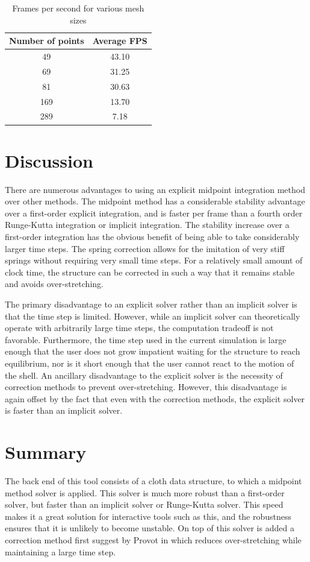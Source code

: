 \documentclass{thesis}
\begin{document}
\begin{table}
\begin{center}
  \begin{tabular}{ | c | c | }
    \hline
    Number of points & Average FPS \\ \hline
	49 & 43.10 \\ \hline
	69 & 31.25 \\ \hline
    81 & 30.63 \\ \hline
	169 & 13.70 \\ \hline
    289 & 7.18 \\ \hline
  \end{tabular}
  \caption{Frames per second for various mesh sizes}
\end{center}
\end{table}

\section{Discussion}
There are numerous advantages to using an explicit midpoint integration method over other methods.  The midpoint method has a
considerable stability advantage over a first-order explicit integration, and is faster per frame than a fourth order Runge-Kutta
integration or implicit integration.  The stability increase over a first-order integration has the obvious benefit of being able to
take considerably larger time steps.  The spring correction allows for the imitation of very stiff springs without requiring very
small time steps.  For a relatively small amount of clock time, the structure can be corrected in such a way that it remains stable
and avoids over-stretching.

The primary disadvantage to an explicit solver rather than an implicit solver is that the time step is limited.  However, while an
implicit solver can theoretically operate with arbitrarily large time steps, the computation tradeoff is not favorable.  Furthermore,
the time step used in the current simulation is large enough that the user does not grow impatient waiting for the structure to reach
equilibrium, nor is it short enough that the user cannot react to the motion of the shell.  An ancillary disadvantage to the
explicit solver is the necessity of correction methods to prevent over-stretching.  However, this disadvantage is again offset by the
fact that even with the correction methods, the explicit solver is faster than an implicit solver.

\section{Summary}
The back end of this tool consists of a cloth data structure, to which a midpoint method solver is applied.  This solver is much more
robust than a first-order solver, but faster than an implicit solver or Runge-Kutta solver.  This speed makes it a great solution
for interactive tools such as this, and the robustness ensures that it is unlikely to become unstable.  On top of this solver is
added a correction method first suggest by Provot in \cite{provot95deformationconstraints} which reduces over-stretching while
maintaining a large time step.
\end{document}
